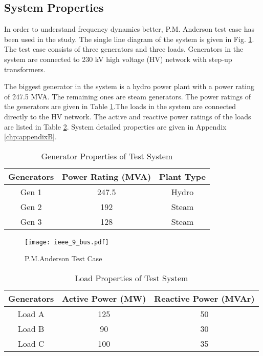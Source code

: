 \subsection{System Properties}
In order to understand frequency dynamics better, P.M. Anderson test case has been used in the study. The single line diagram of the system is given in Fig. \ref{ieee_9_bus}. The test case consists of three generators and three loads. Generators in the system are connected to 230 kV high voltage (HV) network with step-up transformers.\par
The biggest generator in the system is a hydro power plant with a power rating of 247.5 MVA. The remaining ones are steam generators. The power ratings of the generators are given in Table \ref{generatorproperties}.The loads in the system are connected directly to the HV network. The active and reactive power ratings of the loads are listed in Table \ref{loadproperties}. System detailed properties are given in Appendix \ref{chp:appendixB}.
\begin{table}[h]
	\centering
	\begin{tabular}{ccc}
		\hline
		\textbf{Generators} & \textbf{Power Rating (MVA)} & \textbf{Plant Type} \\ \hline
		Gen 1               & 247.5                       & Hydro				\\
		Gen 2               & 192                         & Steam               \\
		Gen 3               & 128                         & Steam               \\ \hline
	\end{tabular}
	\caption{Generator Properties of Test System}
	\label{generatorproperties}
\end{table}
\begin{figure}[h]
	\centering
	\texttt{[image: ieee\_9\_bus.pdf]}
	\caption{P.M.Anderson Test Case}
	\label{ieee_9_bus}
\end{figure}
\begin{table}[h!]
	\centering
	\begin{tabular}{ccc}
		\hline
		\textbf{Generators} & \textbf{Active Power (MW)}  & \textbf{Reactive Power (MVAr)} \\ \hline
		Load A              & 125                      	  & 50				 \\
		Load B              & 90                          & 30                \\
		Load C              & 100                         & 35                \\ \hline
	\end{tabular}
	\caption{Load Properties of Test System}
	\label{loadproperties}
\end{table}
